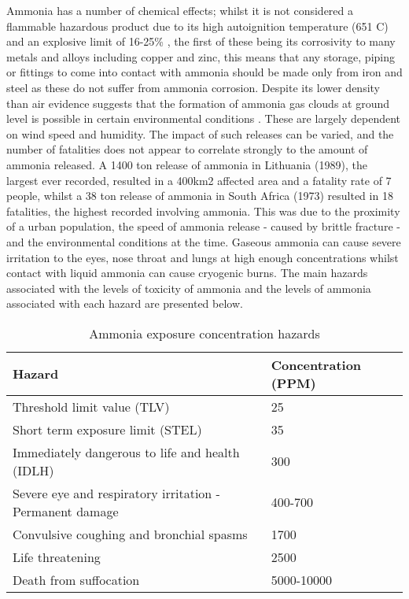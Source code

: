 Ammonia has a number of chemical effects; whilst it is not considered a  flammable hazardous product due to its high autoignition temperature (651 \textdegree C) and an explosive limit of 16-25\% \cite{Ojha2010}, the first of these being its corrosivity to many metals and alloys including copper and zinc, this means that any storage, piping or fittings to come into contact with ammonia should be made only from iron and steel as these do not suffer from ammonia corrosion.
Despite its lower density than air evidence suggests that the formation of ammonia gas clouds at ground level is possible in certain environmental conditions \cite{Griffiths1982}. These are largely dependent on wind speed and humidity. The impact of such releases can be varied, and the number of fatalities does not appear to correlate strongly to the amount of ammonia released. A 1400 ton release of ammonia in Lithuania (1989), the largest ever recorded, resulted in a 400km2 affected area and a fatality rate of 7 people, whilst a 38 ton release of ammonia in South Africa (1973) resulted in 18 fatalities,  the highest recorded involving ammonia. This was due to the proximity of a urban population, the speed of ammonia release - caused by brittle fracture - and the environmental conditions at the time\cite{Ojha2010}. Gaseous ammonia can cause severe irritation to the eyes, nose throat and lungs at high enough concentrations whilst contact with liquid ammonia can cause cryogenic burns. The main hazards associated with the levels of toxicity of ammonia and the levels of ammonia associated with each hazard are presented below.

\begin{table}[!htbp]
	\begin{center} 
		\caption{Ammonia exposure concentration hazards}
		\begin{tabular}{ |l||l|  }
			\hline
			Hazard & Concentration (PPM)\\
			\hline
			Threshold limit value (TLV) & 25\\
			\hline
			Short term exposure limit (STEL)& 35\\
			\hline
			Immediately dangerous to life and health (IDLH)&300 \\
			\hline
			Severe eye and respiratory irritation - Permanent damage  &400-700\\
			\hline
			Convulsive coughing and bronchial spasms &1700\\
			\hline
			Life threatening   &2500 \\
			\hline
			Death from suffocation  &5000-10000 \\
			\hline
		\end{tabular}
	\end{center}
\end{table}

